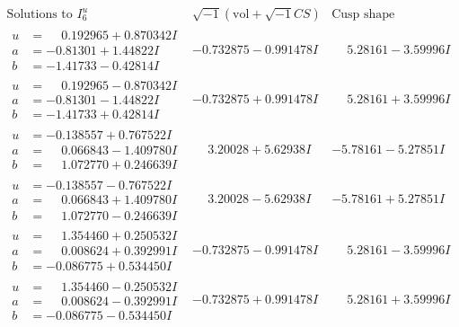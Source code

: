 \documentclass[1p]{elsarticle_modified}
\theoremstyle{definition}
\newcommand{\I}{\sqrt{-1}}
\begin{document}
$$\begin{array}{c|c|c}  
\text{Solutions to }I^u_{6}& \I (\text{vol} + \sqrt{-1}CS) & \text{Cusp shape}\\
 \hline 
\begin{aligned}
u &= \phantom{-}0.192965 + 0.870342 I \\
a &= -0.81301 + 1.44822 I \\
b &= -1.41733 - 0.42814 I\end{aligned}
 & -0.732875 - 0.991478 I & \phantom{-}5.28161 - 3.59996 I \\ \hline\begin{aligned}
u &= \phantom{-}0.192965 - 0.870342 I \\
a &= -0.81301 - 1.44822 I \\
b &= -1.41733 + 0.42814 I\end{aligned}
 & -0.732875 + 0.991478 I & \phantom{-}5.28161 + 3.59996 I \\ \hline\begin{aligned}
u &= -0.138557 + 0.767522 I \\
a &= \phantom{-}0.066843 - 1.409780 I \\
b &= \phantom{-}1.072770 + 0.246639 I\end{aligned}
 & \phantom{-}3.20028 + 5.62938 I & -5.78161 - 5.27851 I \\ \hline\begin{aligned}
u &= -0.138557 - 0.767522 I \\
a &= \phantom{-}0.066843 + 1.409780 I \\
b &= \phantom{-}1.072770 - 0.246639 I\end{aligned}
 & \phantom{-}3.20028 - 5.62938 I & -5.78161 + 5.27851 I \\ \hline\begin{aligned}
u &= \phantom{-}1.354460 + 0.250532 I \\
a &= \phantom{-}0.008624 + 0.392991 I \\
b &= -0.086775 + 0.534450 I\end{aligned}
 & -0.732875 - 0.991478 I & \phantom{-}5.28161 - 3.59996 I \\ \hline\begin{aligned}
u &= \phantom{-}1.354460 - 0.250532 I \\
a &= \phantom{-}0.008624 - 0.392991 I \\
b &= -0.086775 - 0.534450 I\end{aligned}
 & -0.732875 + 0.991478 I & \phantom{-}5.28161 + 3.59996 I \\ \hline\begin{aligned}

\end{aligned}
\end{array}$$
\end{document}
